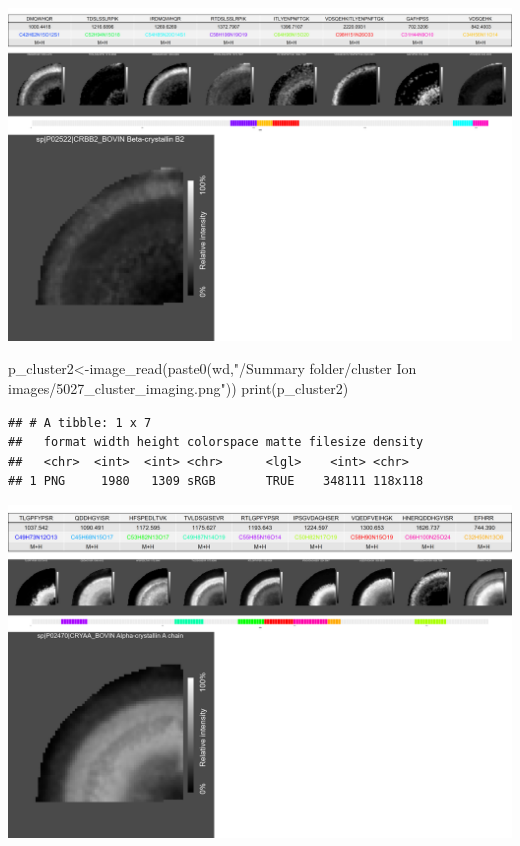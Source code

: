 \documentclass[
]{article}
\newenvironment{Shaded}{\begin{snugshade}}{\end{snugshade}}
\newcommand{\FunctionTok}[1]{\textcolor[rgb]{0.00,0.00,0.00}{#1}}
\newcommand{\NormalTok}[1]{#1}
\newcommand{\OtherTok}[1]{\textcolor[rgb]{0.56,0.35,0.01}{#1}}
\newcommand{\StringTok}[1]{\textcolor[rgb]{0.31,0.60,0.02}{#1}}
\begin{document}
\includegraphics[width=27.5in]{README_files/figure-latex/CLuster imaging-1}

\begin{Shaded}
\begin{Highlighting}[]
\NormalTok{p\_cluster2}\OtherTok{\textless{}{-}}\FunctionTok{image\_read}\NormalTok{(}\FunctionTok{paste0}\NormalTok{(wd,}\StringTok{"/Summary folder/cluster Ion images/5027\_cluster\_imaging.png"}\NormalTok{))}
\FunctionTok{print}\NormalTok{(p\_cluster2)}
\end{Highlighting}
\end{Shaded}

\begin{verbatim}
## # A tibble: 1 x 7
##   format width height colorspace matte filesize density
##   <chr>  <int>  <int> <chr>      <lgl>    <int> <chr>  
## 1 PNG     1980   1309 sRGB       TRUE    348111 118x118
\end{verbatim}

\includegraphics[width=27.5in]{README_files/figure-latex/CLuster imaging-2}
\end{document}
